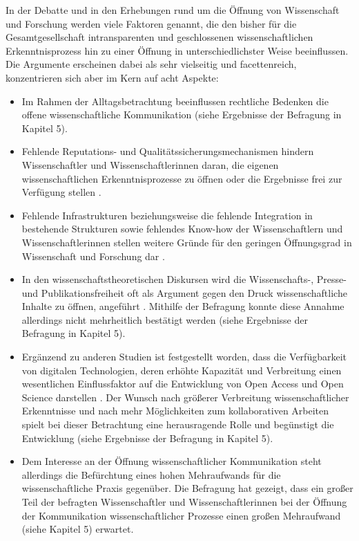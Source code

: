 In der Debatte und in den Erhebungen rund um die Öffnung von Wissenschaft und Forschung werden viele Faktoren genannt, die den bisher für die Gesamtgesellschaft intransparenten und geschlossenen wissenschaftlichen Erkenntnisprozess hin zu einer Öffnung in unterschiedlichster Weise beeinflussen. Die Argumente erscheinen dabei als sehr vielseitig und facettenreich, konzentrieren sich aber im Kern auf acht Aspekte:

\begin{itemize}
\item Im Rahmen der Alltagsbetrachtung beeinflussen rechtliche Bedenken die offene wissenschaftliche Kommunikation (siehe Ergebnisse der Befragung in Kapitel 5).
\item Fehlende Reputations- und Qualitätssicherungsmechanismen hindern Wissenschaftler und Wissenschaftlerinnen daran, die eigenen wissenschaftlichen Erkenntnisprozesse zu öffnen oder die Ergebnisse frei zur Verfügung stellen \cite{Herb_2015}.
\item Fehlende Infrastrukturen beziehungsweise die fehlende Integration in bestehende Strukturen sowie fehlendes Know-how der Wissenschaftlern und Wissenschaftlerinnen stellen weitere Gründe für den geringen Öffnungsgrad in Wissenschaft und Forschung dar \cite{European_Commission_2015b}.
\item In den wissenschaftstheoretischen Diskursen wird die Wissenschafts-, Presse- und Publikationsfreiheit oft als Argument gegen den Druck wissenschaftliche Inhalte zu öffnen, angeführt \cite{Fehling_2014}. Mithilfe der Befragung konnte diese Annahme allerdings nicht mehrheitlich bestätigt werden (siehe Ergebnisse der Befragung in Kapitel 5).
\item Ergänzend zu anderen Studien ist festgestellt worden, dass die Verfügbarkeit von digitalen Technologien, deren erhöhte Kapazität und Verbreitung einen wesentlichen Einflussfaktor auf die Entwicklung von Open Access und Open Science darstellen \cite{European_Commission_2015b}. Der Wunsch nach größerer Verbreitung wissenschaftlicher Erkenntnisse und nach mehr Möglichkeiten zum kollaborativen Arbeiten spielt bei dieser Betrachtung eine herausragende Rolle und begünstigt die Entwicklung (siehe Ergebnisse der Befragung in Kapitel 5).
\item Dem Interesse an der Öffnung wissenschaftlicher Kommunikation steht allerdings die Befürchtung eines hohen Mehraufwands für die wissenschaftliche Praxis gegenüber. Die Befragung hat gezeigt, dass ein großer Teil der befragten Wissenschaftler und Wissenschaftlerinnen bei der Öffnung der Kommunikation wissenschaftlicher Prozesse einen großen Mehraufwand (siehe Kapitel 5) erwartet.

\end{itemize}
